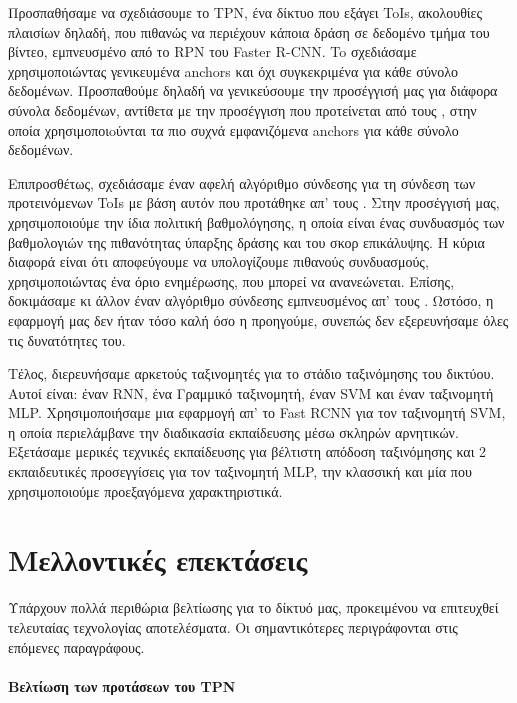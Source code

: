 Προσπαθήσαμε να σχεδιάσουμε   το \en TPN\gr, ένα δίκτυο  που εξάγει \en ToIs, \gr ακολουθίες πλαισίων  δηλαδή, που πιθανώς να περιέχουν κάποια δράση  
σε δεδομένο τμήμα του βίντεο, εμπνευσμένο από το \en  RPN \gr  του \en Faster R-CNN\gr. To σχεδιάσαμε
χρησιμοποιώντας γενικευμένα \en anchors \gr  και όχι συγκεκριμένα για κάθε σύνολο δεδομένων. Προσπαθούμε δηλαδή
να γενικεύσουμε την προσέγγισή μας για διάφορα σύνολα δεδομένων, αντίθετα με την προσέγγιση
που προτείνεται από τους \en \cite{DBLP:journals/corr/abs-1712-09184}\gr, στην οποία χρησιμοποιoύνται τα πιο συχνά εμφανιζόμενα
\en anchors \gr για κάθε σύνολο δεδομένων.

Επιπροσθέτως, σχεδιάσαμε έναν αφελή αλγόριθμο σύνδεσης για τη σύνδεση
των προτεινόμενων \en ToIs \gr  με βάση αυτόν που προτάθηκε απ' τους \en \cite{DBLP:journals/corr/abs-1712-09184}\gr.
Στην προσέγγισή μας, χρησιμοποιούμε την ίδια πολιτική βαθμολόγησης, η οποία είναι ένας συνδυασμός των βαθμολογιών της πιθανότητας ύπαρξης δράσης και του σκορ επικάλυψης.
Η κύρια διαφορά είναι ότι αποφεύγουμε να υπολογίζουμε
πιθανούς συνδυασμούς, χρησιμοποιώντας ένα όριο ενημέρωσης, που μπορεί να ανανεώνεται. Επίσης, δοκιμάσαμε κι άλλον έναν
αλγόριθμο σύνδεσης εμπνευσμένος απ' τους \cite{DBLP:journals/corr/abs-1903-00304}.
Ωστόσο, η εφαρμογή μας δεν ήταν τόσο καλή όσο η προηγούμε, συνεπώς δεν εξερευνήσαμε όλες τις δυνατότητες του.

Τέλος, διερευνήσαμε αρκετούς ταξινομητές  για το στάδιο ταξινόμησης του
δικτύου. Αυτοί είναι: έναν \en RNN\gr, ένα Γραμμικό ταξινομητή, έναν \en SVM \gr  και έναν ταξινομητή \en MLP\gr.
Χρησιμοποιήσαμε μια εφαρμογή απ' το  Fast RCNN για τον ταξινομητή  \en SVM\gr, η οποία περιελάμβανε την διαδικασία
εκπαίδευσης μέσω σκληρών αρνητικών. Εξετάσαμε μερικές τεχνικές εκπαίδευσης για
βέλτιστη απόδοση ταξινόμησης και 2 εκπαιδευτικές προσεγγίσεις για τον ταξινομητή \en MLP\gr, την κλασσική και μία που
χρησιμοποιούμε προεξαγόμενα χαρακτηριστικά.

\section{Μελλοντικές επεκτάσεις}

Υπάρχουν πολλά περιθώρια βελτίωσης για το δίκτυό μας, προκειμένου να επιτευχθεί
τελευταίας τεχνολογίας αποτελέσματα. Οι σημαντικότερες περιγράφονται στις επόμενες παραγράφους.

\paragraph{Βελτίωση των προτάσεων του \en TPN\gr}

